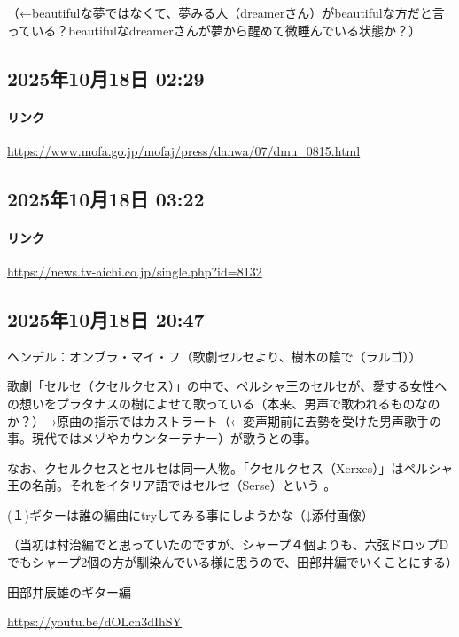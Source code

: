 \documentclass[facebook_diary.tex]{subfiles}
\begin{document}
（←beautifulな夢ではなくて、夢みる人（dreamerさん）がbeautifulな方だと言っている？beautifulなdreamerさんが夢から醒めて微睡んでいる状態か？）

\subsection*{2025年10月18日 02:29}

\paragraph{リンク}
\url{https://www.mofa.go.jp/mofaj/press/danwa/07/dmu_0815.html}

\subsection*{2025年10月18日 03:22}

\paragraph{リンク}
\url{https://news.tv-aichi.co.jp/single.php?id=8132}

\subsection*{2025年10月18日 20:47}

ヘンデル：オンブラ・マイ・フ（歌劇セルセより、樹木の陰で（ラルゴ））


歌劇「セルセ（クセルクセス）」の中で、ペルシャ王のセルセが、愛する女性への想いをプラタナスの樹によせて歌っている（本来、男声で歌われるものなのか？）→原曲の指示ではカストラート（←変声期前に去勢を受けた男声歌手の事。現代ではメゾやカウンターテナー）が歌うとの事。


なお、クセルクセスとセルセは同一人物。「クセルクセス（Xerxes）」はペルシャ王の名前。それをイタリア語ではセルセ（Serse）という 。


(１)ギターは誰の編曲にtryしてみる事にしようかな（↓添付画像）

（当初は村治編でと思っていたのですが、シャープ４個よりも、六弦ドロップDでもシャープ2個の方が馴染んでいる様に思うので、田部井編でいくことにする）

田部井辰雄のギター編

\url{https://youtu.be/dOLcn3dIhSY}
\end{document}
